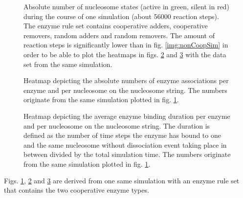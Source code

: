             \begin{figure}[htpb!]
                \centering
                \caption{Absolute number of nucleosome states (active in green, silent in red) during the course of one simulation (about 56000 reaction steps). The enzyme rule set contains cooperative adders, cooperative removers, random adders and random removers. The amount of reaction steps is significantly lower than in fig. \ref{img:nonCoopSim} in order to be able to plot the heatmaps in figs. \ref{img:nonCyclBistability_bindingNumbers} and \ref{img:nonCyclBistability_bindingTimeDuration} with the data set from the same simulation.}
                \label{img:nonCyclBistability_runPlot}
            \end{figure}

            \begin{figure}[htpb!]
                \centering
                \caption{Heatmap depicting the absolute numbers of enzyme associations per enzyme and per nucleosome on the nucleosome string. The numbers originate from the same simulation plotted in fig. \ref{img:nonCyclBistability_runPlot}.}
                \label{img:nonCyclBistability_bindingNumbers}
            \end{figure}

            \begin{figure}[htpb!]
                \centering
                \caption{Heatmap depicting the average enzyme binding duration per enzyme and per nucleosome on the nucleosome string. The duration is defined as the number of time steps the enzyme has bound to one and the same nucleosome without dissociation event taking place in between divided by the total simulation time. The numbers originate from the same simulation plotted in fig. \ref{img:nonCyclBistability_runPlot}.}
                \label{img:nonCyclBistability_bindingTimeDuration}
            \end{figure}

            Figs. \ref{img:nonCyclBistability_runPlot}, \ref{img:nonCyclBistability_bindingNumbers} and \ref{img:nonCyclBistability_bindingTimeDuration} are derived from one same simulation with an enzyme rule set that contains the two cooperative enzyme types.

